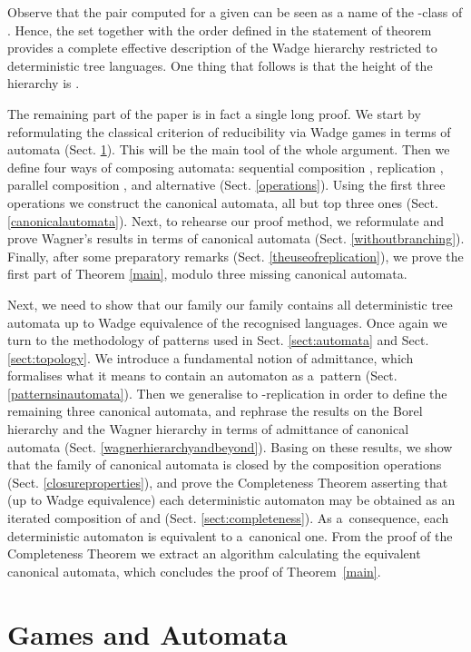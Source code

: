 \documentclass{LMCS}
\begin{document}
Observe that the pair  computed for a given  can be seen
as a name of the -class of . Hence, the set 
 together with the order defined in the
statement of theorem provides a complete effective description of the Wadge hierarchy
restricted to deterministic tree languages. One thing that follows is that the height of the hierarchy is . 


The remaining part of the paper is in fact a single long proof.
We start by reformulating the classical criterion of reducibility via
Wadge games in terms of automata (Sect. \ref{gamesandautomata}). This
will be the main tool of the whole argument. Then we define four ways
of composing automata: sequential composition , replication
, parallel composition , and alternative 
(Sect. \ref{operations}). Using the first three operations we
construct the canonical automata, all but top three ones  
(Sect. \ref{canonicalautomata}). Next, to rehearse our proof method,
we reformulate and prove
Wagner's results in terms of canonical automata (Sect.
\ref{withoutbranching}). Finally, after some preparatory remarks
(Sect. \ref{theuseofreplication}), we prove the first part of Theorem
\ref{main}, modulo three missing canonical automata.

Next, we need to show that our family our family contains all deterministic
tree automata up to Wadge equivalence of the recognised languages. Once again we turn to the
methodology of patterns used in Sect. \ref{sect:automata} and
Sect. \ref{sect:topology}. We introduce a fundamental notion of
admittance, which formalises what it means to contain an automaton as
a~pattern (Sect. \ref{patternsinautomata}). Then we generalise 
to -replication
 in order to define the remaining
three canonical automata, and
rephrase the results on the Borel hierarchy and the Wagner hierarchy
in terms of admittance of canonical automata
(Sect. \ref{wagnerhierarchyandbeyond}). Basing on these results, we
show that the family of canonical automata is closed by the
composition operations (Sect. \ref{closureproperties}), and prove the
Completeness Theorem asserting that (up to Wadge equivalence) each
deterministic automaton may be obtained as an iterated composition of  and  (Sect. \ref{sect:completeness}). As
a~consequence, each deterministic automaton is equivalent to
a~canonical one. From the proof of the Completeness Theorem
we extract an algorithm calculating the equivalent canonical automata, which concludes the proof of Theorem~\ref{main}.


\section{Games and Automata} \label{gamesandautomata}
\end{document}
